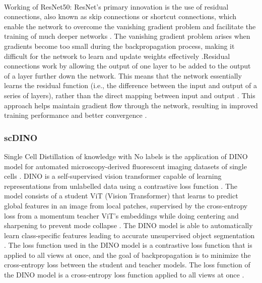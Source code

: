 \documentclass[12pt,a4paper]{article}
\begin{document}
\paragraph{} Working of ResNet50: ResNet's primary innovation is the use of residual connections, also known as skip connections or shortcut connections, which enable the network to overcome the vanishing gradient problem and facilitate the training of much deeper networks \cite{DBLP:journals/corr/HeZRS15}. The vanishing gradient problem arises when gradients become too small during the backpropagation process, making it difficult for the network to learn and update weights effectively \cite{DBLP:journals/corr/HeZRS15}.Residual connections work by allowing the output of one layer to be added to the output of a layer further down the network. This means that the network essentially learns the residual function (i.e., the difference between the input and output of a series of layers), rather than the direct mapping between input and output \cite{DBLP:journals/corr/HeZRS15}. This approach helps maintain gradient flow through the network, resulting in improved training performance and better convergence \cite{DBLP:journals/corr/HeZRS15}.

\subsubsection{scDINO}
Single Cell Distillation of knowledge with No labels is the application of DINO model for automated microscopy-derived fluorescent imaging datasets of single cells \cite{Pfaendler2023.01.16.524226}. DINO is a self-supervised vision transformer capable of learning representations from unlabelled data using a contrastive loss function \cite{Pfaendler2023.01.16.524226}. The model consists of a student ViT (Vision Transformer) that learns to predict global features in an image from local patches, supervised by the cross-entropy loss from a momentum teacher ViT's embeddings while doing centering and sharpening to prevent mode collapse \cite{Pfaendler2023.01.16.524226}. The DINO model is able to automatically learn class-specific features leading to accurate unsupervised object segmentation \cite{Pfaendler2023.01.16.524226}. The loss function used in the DINO model is a contrastive loss function that is applied to all views at once, and the goal of backpropagation is to minimize the cross-entropy loss between the student and teacher models. The loss function of the DINO model is a cross-entropy loss function applied to all views at once \cite{Pfaendler2023.01.16.524226}.
\end{document}
